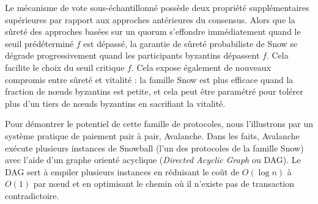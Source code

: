 \documentclass[letterpaper,twocolumn,10pt]{article}
\newcommand{\Oh}[1]{O(#1)}
\newcommand{\editchange}[1]{{\color{orange}#1}}
\theoremstyle{definition}
\begin{document}
Le mécanisme de vote sous-échantillonné possède deux propriété supplémentaires supérieures par rapport aux approches antérieures du consensus.
Alors que la sûreté des approches basées sur un quorum s'effondre immédiatement quand le seuil prédéterminé $f$ est dépassé,
la garantie de sûreté probabiliste de Snow se dégrade progressivement quand les participants byzantins dépassent $f$.
Cela facilite le choix du seuil critique $f$.
Cela expose également de nouveaux compromis entre sûreté et vitalité : la famille Snow est plus efficace quand la fraction de nœuds byzantins est petite, et cela peut être paramétré pour tolérer plus d'un tiers de nœuds byzantins en sacrifiant la vitalité.

Pour démontrer le potentiel de cette famille de protocoles, nous l'illustrons par un système pratique de paiement pair à pair, Avalanche. Dans les faits, Avalanche exécute plusieurs instances de Snowball (l'un des protocoles de la famille Snow) avec l'aide d'un graphe orienté acyclique (\emph{Directed Acyclic Graph} ou DAG). Le DAG sert à empiler plusieurs instances en réduisant le coût de $\Oh{\log{n}}$ à $\Oh{1}$ par nœud et en optimisant le chemin où il n'existe pas de transaction contradictoire.
%
\end{document}
